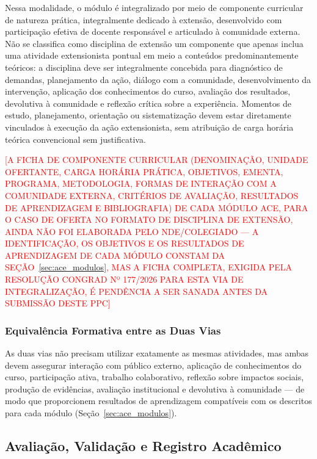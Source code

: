 Nessa modalidade, o módulo é integralizado por meio de componente curricular de natureza prática, integralmente dedicado à extensão, desenvolvido com participação efetiva de docente responsável e articulado à comunidade externa. Não se classifica como disciplina de extensão um componente que apenas inclua uma atividade extensionista pontual em meio a conteúdos predominantemente teóricos: a disciplina deve ser integralmente concebida para diagnóstico de demandas, planejamento da ação, diálogo com a comunidade, desenvolvimento da intervenção, aplicação dos conhecimentos do curso, avaliação dos resultados, devolutiva à comunidade e reflexão crítica sobre a experiência. Momentos de estudo, planejamento, orientação ou sistematização devem estar diretamente vinculados à execução da ação extensionista, sem atribuição de carga horária teórica convencional sem justificativa.

\textcolor{red}{[A FICHA DE COMPONENTE CURRICULAR (DENOMINAÇÃO, UNIDADE OFERTANTE, CARGA HORÁRIA PRÁTICA, OBJETIVOS, EMENTA, PROGRAMA, METODOLOGIA, FORMAS DE INTERAÇÃO COM A COMUNIDADE EXTERNA, CRITÉRIOS DE AVALIAÇÃO, RESULTADOS DE APRENDIZAGEM E BIBLIOGRAFIA) DE CADA MÓDULO ACE, PARA O CASO DE OFERTA NO FORMATO DE DISCIPLINA DE EXTENSÃO, AINDA NÃO FOI ELABORADA PELO NDE/COLEGIADO — A IDENTIFICAÇÃO, OS OBJETIVOS E OS RESULTADOS DE APRENDIZAGEM DE CADA MÓDULO CONSTAM DA SEÇÃO~\ref{sec:ace_modulos}, MAS A FICHA COMPLETA, EXIGIDA PELA RESOLUÇÃO CONGRAD Nº 177/2026 PARA ESTA VIA DE INTEGRALIZAÇÃO, É PENDÊNCIA A SER SANADA ANTES DA SUBMISSÃO DESTE PPC]}

\subsubsection{Equivalência Formativa entre as Duas Vias}

As duas vias não precisam utilizar exatamente as mesmas atividades, mas ambas devem assegurar interação com público externo, aplicação de conhecimentos do curso, participação ativa, trabalho colaborativo, reflexão sobre impactos sociais, produção de evidências, avaliação institucional e devolutiva à comunidade — de modo que proporcionem resultados de aprendizagem compatíveis com os descritos para cada módulo (Seção~\ref{sec:ace_modulos}\unskip).

\subsection{Avaliação, Validação e Registro Acadêmico}
\label{sec:ace_avaliacao_registro}

